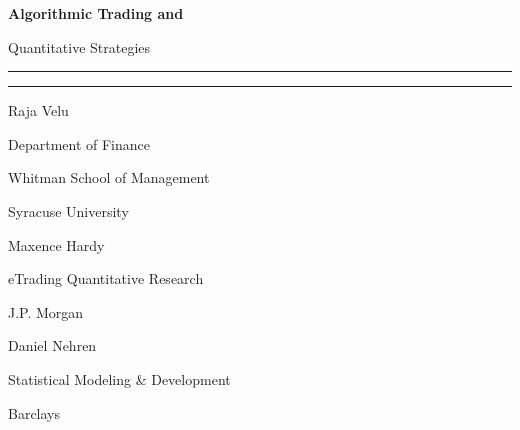 \thispagestyle{empty}
{\bfseries\Huge Algorithmic Trading and \par Quantitative Strategies}

\noindent\rule{\textwidth}{0.5pt} \par
\vspace{-0.3cm}\noindent\rule{0.25\textwidth}{4pt}


\par\vspace{0.5cm} 
\begin{minipage}{0.3\textwidth}
\large Raja Velu \par
{\scriptsize
Department of Finance \hfill \par
Whitman School of Management \hfill \par
Syracuse University \hfill \par\vspace{0.15cm}
}
\end{minipage}%
\begin{minipage}{0.3\textwidth}
\large Maxence Hardy \par
{\scriptsize
eTrading Quantitative Research \hfill \par
J.P. Morgan \hfill \par
\phantom{Push Text Up}
}
\end{minipage}%
\begin{minipage}{0.35\textwidth}
\large Daniel Nehren \par
{\scriptsize
Statistical Modeling \& Development \hfill \par 
Barclays \hfill \par
\phantom{Push Text Up}
}
\end{minipage} \vfill


